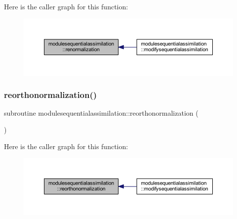 Here is the caller graph for this function\+:\nopagebreak
\begin{figure}[H]
\begin{center}
\leavevmode
\includegraphics[width=350pt]{namespacemodulesequentialassimilation_a5ba1ccc67425087e399ba6f24403f98e_icgraph}
\end{center}
\end{figure}
\mbox{\label{namespacemodulesequentialassimilation_aaf3bc60a00c40a50536d48987d7294dd}} 
\subsubsection{\texorpdfstring{reorthonormalization()}{reorthonormalization()}}
{\footnotesize\ttfamily subroutine modulesequentialassimilation\+::reorthonormalization (\begin{DoxyParamCaption}{ }\end{DoxyParamCaption})\hspace{0.3cm}{\ttfamily [private]}}

Here is the caller graph for this function\+:\nopagebreak
\begin{figure}[H]
\begin{center}
\leavevmode
\includegraphics[width=350pt]{namespacemodulesequentialassimilation_aaf3bc60a00c40a50536d48987d7294dd_icgraph}
\end{center}
\end{figure}
\mbox{\label{namespacemodulesequentialassimilation_a1cda513ededcf93d8f84bd9f6e39ba43}} 
